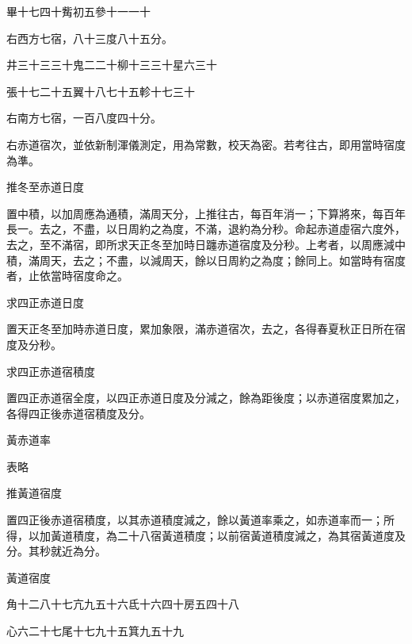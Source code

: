 \begin{pinyinscope}
 畢十七四十觜初五參十一一十



 右西方七宿，八十三度八十五分。



 井三十三三十鬼二二十柳十三三十星六三十



 張十七二十五翼十八七十五軫十七三十



 右南方七宿，一百八度四十分。



 右赤道宿次，並依新制渾儀測定，用為常數，校天為密。若考往古，即用當時宿度為準。



 推冬至赤道日度



 置中積，以加周應為通積，滿周天分，上推往古，每百年消一；下算將來，每百年長一。去之，不盡，以日周約之為度，不滿，退約為分秒。命起赤道虛宿六度外，去之，至不滿宿，即所求天正冬至加時日躔赤道宿度及分秒。上考者，以周應減中積，滿周天，去之；不盡，以減周天，餘以日周約之為度；餘同上。如當時有宿度者，止依當時宿度命之。



 求四正赤道日度



 置天正冬至加時赤道日度，累加象限，滿赤道宿次，去之，各得春夏秋正日所在宿度及分秒。



 求四正赤道宿積度



 置四正赤道宿全度，以四正赤道日度及分減之，餘為距後度；以赤道宿度累加之，各得四正後赤道宿積度及分。



 黃赤道率



 表略



 推黃道宿度



 置四正後赤道宿積度，以其赤道積度減之，餘以黃道率乘之，如赤道率而一；所得，以加黃道積度，為二十八宿黃道積度；以前宿黃道積度減之，為其宿黃道度及分。其秒就近為分。



 黃道宿度



 角十二八十七亢九五十六氐十六四十房五四十八



 心六二十七尾十七九十五箕九五十九




\end{pinyinscope}

